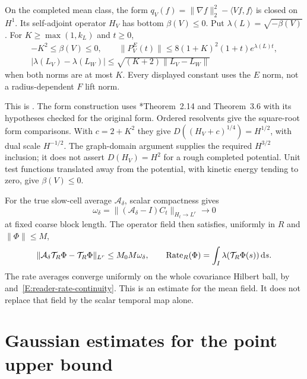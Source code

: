 \begin{lemma}\label{L:reader-spectral}
  On the completed mean class, the form $q_V(f) = \|\nabla f\|_2^2-\langle
  Vf,f\rangle$ is closed on $H^1$. Its self-adjoint operator $H_V$ has bottom
  $\beta(V) \le 0$. Put $\lambda(L) = \sqrt{-\beta(V)}$. For $K \ge \max(1,k_L)$
  and $t \ge 0$,
  \begin{gather}
    -K^2\le\beta(V)\le0,\qquad
    \|P_V^E(t)\|\le8(1+K)^2(1+t)e^{\lambda(L)t},
    \label{E:reader-spectral}\\
    |\lambda(L_V)-\lambda(L_W)|
    \le\sqrt{(K+2)\|L_V-L_W\|}
    \label{E:reader-rate-continuity}
  \end{gather}
  when both norms are at most $K$. Every displayed constant uses the $E$ norm,
  not a radius-dependent $F$ lift norm.
\end{lemma}

This is . The form construction uses
\cite{teschl:14:mathematical}*{Theorem~2.14 and Theorem~3.6} with its hypotheses
checked for the original form. Ordered resolvents give the square-root form
comparisons. With $c = 2+K^2$ they give $D((H_V+c)^{1/4}) = H^{1/2}$, with dual
scale $H^{-1/2}$. The graph-domain argument supplies the required $H^{3/2}$
inclusion; it does not assert $D(H_V) = H^2$ for a rough completed potential.
Unit test functions translated away from the potential, with kinetic energy
tending to zero, give $\beta(V) \le 0$.

For the true slow-cell average $\mathcal{A}_\delta$, scalar compactness gives
\[
  \omega_\delta=
  \|(\mathcal{A}_\delta-I)C_t\|_{H_t\to L^r}\longrightarrow0
\]
at fixed coarse block length. The operator field then satisfies, uniformly in
$R$ and $\|\Phi\| \le M$,
\begin{equation}\label{E:reader-rate-average}
  \|\mathcal{A}_\delta\mathcal{T}_R\Phi-\mathcal{T}_R\Phi\|_{L^r}
  \le M_0M\omega_\delta,
  \qquad
  \operatorname{Rate}_R(\Phi)=\int_I\lambda(\mathcal{T}_R\Phi(s))\,\mathrm d s.
\end{equation}
The rate averages converge uniformly on the whole covariance Hilbert ball, by
and~\eqref{E:reader-rate-continuity}. This is an estimate for the mean field. It
does not replace that field by the scalar temporal map alone.

\section{Gaussian estimates for the point upper bound}
\label{S:reader-tubes}
